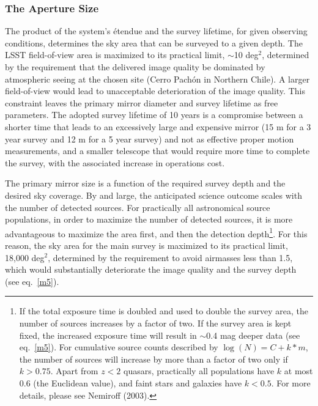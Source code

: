 \documentclass{emulateapj}
\begin{document}
\subsubsection{ The Aperture Size }
\label{Sec:apSize}
The product of the system's \'etendue and the survey lifetime, for given
observing conditions, determines
the sky area that can be surveyed to a given depth. 
The 
LSST field-of-view area is maximized to its practical limit, $\sim$10 deg$^2$, 
determined by the requirement that the delivered image quality be dominated 
by atmospheric seeing at the chosen site (Cerro Pach\'{o}n in Northern Chile). 
A larger field-of-view would lead to unacceptable deterioration of the 
image quality. This constraint leaves the primary mirror diameter and survey lifetime 
as free parameters. The adopted survey lifetime of 10 years is a compromise 
between a shorter time that leads to an excessively large and expensive mirror (15 m for a 
3 year survey and 12 m for a 5 year survey) and not as effective proper motion
measurements, and a smaller telescope that would require more time to complete the 
survey, with the associated increase in operations cost.

The primary mirror size is a function of the required survey depth and the 
desired sky coverage. By and large, the anticipated science outcome scales 
with the number of detected sources. For practically all astronomical source 
populations, in order to maximize the number of detected sources, it is more 
advantageous to maximize the area first, and then 
the detection depth\footnote{ 
If the total exposure time is doubled and used to double the survey area, 
the number of sources increases by a factor of two. If the survey 
area is kept fixed, the increased exposure time will result in 
$\sim$0.4 mag deeper data (see eq.~\ref{m5}). For cumulative source 
counts described by $\log(N) = C + k*m$, the number of sources
will increase by more than a factor of two only if $k>0.75$. 
Apart from $z<2$ quasars, practically all populations 
have $k$ at most 0.6 (the Euclidean value), and faint stars 
and galaxies have $k<0.5$. For more details, please see Nemiroff
(2003).}. For this reason, the sky area for the main survey is 
maximized to its practical limit, 18,000 deg$^2$, determined by the 
requirement to avoid airmasses less than 1.5, 
which would substantially 
deteriorate the image quality and the survey depth (see eq.~\ref{m5}). 
\end{document}
